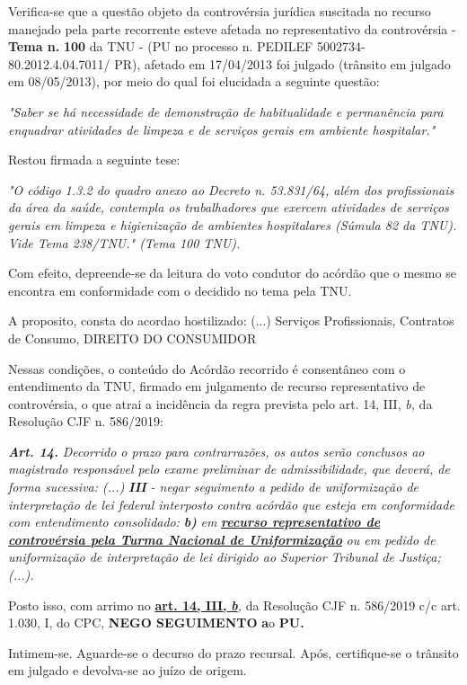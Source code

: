 \documentclass[12pt]{article}
\begin{document}
\justifying
\noindent Verifica-se que a questão objeto da controvérsia jurídica suscitada no recurso manejado pela parte recorrente esteve afetada no representativo da controvérsia - \textbf{Tema n. }\textbf{100} da TNU - (PU no processo n. PEDILEF 5002734-80.2012.4.04.7011/ PR),  afetado em 17/04/2013 foi julgado (trânsito em julgado em 08/05/2013), por meio do qual foi elucidada a seguinte questão:

\noindent \textit{"Saber se há necessidade de demonstração de habitualidade e permanência para enquadrar atividades de limpeza e de serviços gerais em ambiente hospitalar."}

\noindent Restou firmada a seguinte tese:

\noindent \textit{"O código 1.3.2 do quadro anexo ao Decreto n. 53.831/64, além dos profissionais da área da saúde, contempla os trabalhadores que exercem atividades de serviços gerais em limpeza e higienização de ambientes hospitalares (Súmula 82 da TNU). Vide Tema 238/TNU." (Tema 100 TNU).}

\noindent Com efeito, depreende-se da leitura do voto condutor do acórdão que o mesmo se encontra em conformidade com o decidido no  tema pela TNU.

\noindent A proposito, consta do acordao hostilizado: (...) Serviços Profissionais, Contratos de Consumo, DIREITO DO CONSUMIDOR

\noindent Nessas condições, o conteúdo do Acórdão recorrido é consentâneo com o entendimento da TNU, firmado em julgamento de recurso representativo de controvérsia, o que atrai a incidência da regra prevista pelo art. 14, III, \textit{b,} da Resolução CJF n. 586/2019:

\noindent \textit{\textbf{Art. 14.}}\textit{ Decorrido o prazo para contrarrazões, os autos serão conclusos ao magistrado responsável pelo exame preliminar de admissibilidade, que deverá, de forma sucessiva: (...) }\textit{\textbf{III }}\textit{- negar seguimento a pedido de uniformização de interpretação de lei federal interposto contra acórdão que esteja em conformidade com entendimento consolidado: }\textit{\textbf{b)}}\textit{ em }\uline{\textit{\textbf{recurso representativo de controvérsia pela Turma Nacional de Uniformização}}}\textit{ ou em pedido de uniformização de interpretação de lei dirigido ao Superior Tribunal de Justiça;(...).}

\noindent Posto isso, com arrimo no \uline{\textbf{art. 14, III, }}\uline{\textit{\textbf{b}}}\textit{,} da Resolução CJF n. 586/2019 c/c art. 1.030, I, do CPC, \textbf{NEGO SEGUIMENTO }\textbf{a}o\textbf{ PU}\textbf{.}

\noindent Intimem-se. Aguarde-se o decurso do prazo recursal. Após, certifique-se o trânsito em julgado e devolva-se ao juízo de origem.
\end{document}
